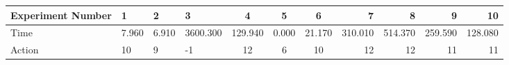 \documentclass[8pt]{article}
\begin{document}
\begin{landscape}
\begin{tabular}{ | l | l | l | l | c | c | c | r | r | r | r | }
 \hline 
Experiment Number & 1 & 2 & 3 & 4 & 5 & 6 & 7 & 8 & 9 & 10\\ \hline
Time & 7.960 & 6.910 & 3600.300 & 129.940 & 0.000 & 21.170 & 310.010 & 514.370 & 259.590 & 128.080\\ \hline
Action & 10 & 9 & -1 & 12 & 6 & 10 & 12 & 12 & 11 & 11\\ \hline\end{tabular}
\end{landscape}
\end{document}
